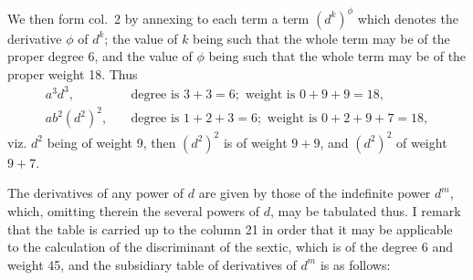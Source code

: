 \documentclass[11pt,a4paper]{book}
\begin{document}
We then form col.~2 by annexing to each term a term $(d^k)^\phi$ which denotes the derivative $\phi$ of $d^k$; the value of $k$ being such that the whole term may be of the proper degree 6, and the value of $\phi$ being such that the whole term may be of the proper weight 18. Thus
\begin{align*}
a^3d^3,\quad &\text{degree is }3+3=6;\text{ weight is }0+9+9=18,\\
ab^2(d^2)^2,\quad &\text{degree is }1+2+3=6;\text{ weight is }0+2+9+7=18,
\end{align*}
viz. $d^2$ being of weight 9, then $(d^2)^2$ is of weight $9+9$, and $(d^2)^2$ of weight $9+7$.

The derivatives of any power of $d$ are given by those of the indefinite power $d^m$, which, omitting therein the several powers of $d$, may be tabulated thus. I remark that the table is carried up to the column 21 in order that it may be applicable to the calculation of the discriminant of the sextic, which is of the degree 6 and weight 45, and the subsidiary table of derivatives of $d^m$ is as follows:
\end{document}
